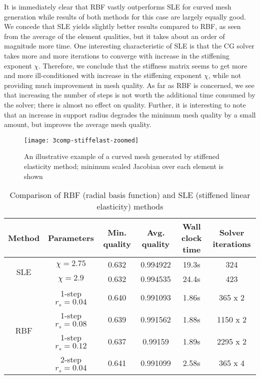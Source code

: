 It is immediately clear that RBF vastly outperforms SLE for curved mesh generation while results of both methods for this case are largely equally good. We concede that SLE yields slightly better results compared to RBF, as seen from the average of the element qualities, but it takes about an order of magnitude more time. One interesting characteristic of SLE is that the CG solver takes more and more iterations to converge with increase in the stiffening exponent $\chi$. Therefore, we conclude that the stiffness matrix seems to get more and more ill-conditioned with increase in the stiffening exponent $\chi$, while not providing much improvement in mesh quality. As far as RBF is concerned, we see that increasing the number of steps is not worth the additional time consumed by the solver; there is almost no effect on quality. Further, it is interesting to note that an increase in support radius degrades the minimum mesh quality by a small amount, but improves the average mesh quality.

\begin{figure}
 	\centering
 	\texttt{[image: 3comp-stiffelast-zoomed]}
 	\caption{An illustrative example of a curved mesh generated by stiffened elasticity method; minimum scaled Jacobian over each element is shown}
 	\label{fig:3compstiffelast}
\end{figure}

\begin{table}
\begin{tabular}{|c|c|c|c|c|c|}
\hline
 Method & Parameters & Min. quality & Avg. quality & Wall clock time & Solver iterations \\
 \hline
\multirow{2}{0.5in}{SLE} & $\chi=2.75$ & 0.632 & 0.994922 & 19.3s & 324 \\
				 & $\chi=2.9$ & 0.632 & 0.994535 & 24.4s & 423 \\
\hline
\multirow{4}{0.5in}{RBF} & 1-step $r_s=0.04$ & 0.640 & 0.991093 & 1.86s & 365 x 2 \\
				&   1-step $r_s=0.08$ & 0.639 & 0.991562 & 1.88s & 1150 x 2\\
				&   1-step $r_s=0.12$ & 0.637 & 0.99159  & 1.89s & 2295 x 2 \\
				&   2-step $r_s=0.04$ & 0.641 & 0.991099 & 2.58s & 365 x 4\\
\hline
\end{tabular}
\caption{Comparison of RBF (radial basis function) and SLE (stiffened linear elasticity) methods}
\label{tab:rbfelast}
\end{table}
 
